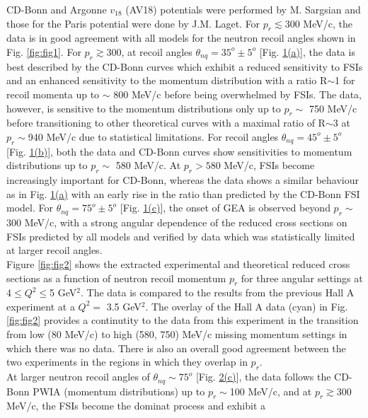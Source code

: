 CD-Bonn and Argonne $v_{18}$ (AV18)\cite{PhysRevC.51.38} potentials were performed by M. Sargsian and those for the Paris potential\cite{PhysRevC.21.861} were done by J.M. Laget. For $p_{r}\lesssim 300$ MeV/c, the data is
in good agreement with all models for the neutron recoil angles shown in Fig. \ref{fig:fig1}. For $p_{r}\gtrsim 300$, at recoil angles $\theta_{nq} = 35^{o}\pm5^{o}$ [Fig. \hyperref[fig:fig1]{1(a)}],
the data is best described by the CD-Bonn curves which exhibit a reduced sensitivity to FSIs and an enhanced sensitivity to the momentum distribution with a ratio R$\sim$1 for recoil momenta
up to $\sim$ 800 MeV/c before being overwhelmed by FSIs. The data, however, is sensitive to the momentum distributions only up to $p_{r}\sim$ 750 MeV/c before transitioning to other theoretical curves
with a maximal ratio of R$\sim$3 at $p_{r}\sim$940 MeV/c due to statistical limitations. For recoil angles $\theta_{nq} = 45^{o}\pm5^{o}$ [Fig. \hyperref[fig:fig1]{1(b)}], both the data and
CD-Bonn curves show sensitivities to momentum distributions up to $p_{r}\sim$ 580 MeV/c. At $p_{r}>580$ MeV/c, FSIs become increasingly important for CD-Bonn, whereas the data shows
a similar behaviour as in Fig. \hyperref[fig:fig1]{1(a)} with an early rise in the ratio than predicted by the CD-Bonn FSI model. For $\theta_{nq} = 75^{o}\pm5^{o}$ [Fig. \hyperref[fig:fig1]{1(c)}], the
onset of GEA is observed beyond $p_{r}\sim$ 300 MeV/c, with a strong angular dependence of the reduced cross sections on FSIs predicted by all models and verified by data which was statistically limited
at larger recoil angles. \\
\indent Figure \ref{fig:fig2} shows the extracted experimental and theoretical reduced cross sections as a function of neutron recoil momentum $p_{r}$ for three angular settings at 4$\leq Q^{2} \leq$5
GeV$^{2}$. The data is compared to the results from the previous Hall A experiment\cite{PhysRevLett.107.262501} at a $Q^{2}=$ 3.5 GeV$^{2}$.  The overlay of the Hall A data (cyan) in Fig. \ref{fig:fig2}
provides a continutity to the data from this experiment in the transition from low (80 MeV/c) to high (580, 750) MeV/c missing momentum settings in which there
was no data. There is also an overall good agreement between the two experiments in the regions in which they overlap in $p_{r}$. \\
\indent At larger neutron recoil angles of $\theta_{nq}\sim75^{o}$ [Fig. \hyperref[fig:fig2]{2(c)}], the data follows the CD-Bonn PWIA (momentum distributions) up to $p_{r}\sim $100 MeV/c, and at $p_{r}\gtrsim$300 MeV/c, the FSIs become the dominat process and exhibit a
